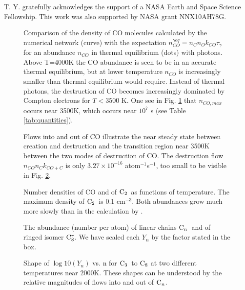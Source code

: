 \documentclass[manuscript]{aastex}
\newcommand{\ctwo}{{\rm C}_2}
\newcommand{\cthree}{{\rm C}_3}
\newcommand{\ceight}{{\rm C}_8}
\newcommand{\ceightr}{{\rm C}_8^r}
\newcommand{\cenn}{{\rm C}_n}
\newcommand{\ncogeq}{n_{CO}^{\gamma eq}}
\begin{document}
\begin{CJK*}{UTF8}{gbsn}
\acknowledgments

T. Y. gratefully acknowledges the support of
a NASA Earth and Space Science Fellowship.
This work was also supported by NASA grant NNX10AH78G.

\clearpage

\begin{figure}
\caption{
Comparison of the density of CO molecules calculated by the numerical
network (curve) with the expectation $\ncogeq = n_C n_O k_{CO} \tau_\gamma$
for an abundance
$n_{CO}$ in thermal equilibrium (dots) with photons.
Above T=4000K the CO abundance is seen to be in an accurate thermal
equilibrium, but at lower temperature $n_{CO}$ is increasingly smaller than
thermal equilibrium would require. Instead of thermal photons,
the destruction of CO becomes increasingly dominated by
Compton electrons for $T < 3500$ K.
One see in Fig. \ref{fig:nco} that $n_{CO,max}$ occurs near 3500K,
which occurs near $10^7$ s (see Table \ref{tab:quantities}).} 
\label{fig:nco}
\end{figure}

\clearpage

\begin{figure}
\caption{
Flows into and out of CO illustrate the near steady state between creation
and destruction and the transition region near 3500K between the two modes
of destruction of CO.
The destruction flow $n_{CO} n_C k_{CO+C}$ is only $3.27 \times
10^{-16}$ atom$^{-1}$s$^{-1}$, too small to be visible in Fig. \ref{fig:flows}. 
} \label{fig:flows}
\end{figure}

\clearpage

\begin{figure}
\caption{
Number densities of CO and of $\ctwo$\ as functions of temperature.
The maximum density of $\ctwo$\ is 0.1 cm$^{-3}$.
Both abundances grow much more slowly than in the calculation by
\citet{2009ApJ...703..642C}.} \label{fig:ncoc2}
\end{figure}

\clearpage

\begin{figure}
\caption{
The abundance (number per atom) of linear chains $\cenn$\ and of ringed isomer
$\ceightr$. We have scaled each $Y_n$ by the factor stated in the box.}
\label{fig:yi}
\end{figure}

\clearpage

\begin{figure}
\caption{
Shape of $\log10(Y_n)$ vs. n for $\cthree$\ to $\ceight$
at two different temperatures
near 2000K. These shapes can be understood by the relative magnitudes of
flows into and out of $\cenn$.
}
\label{fig:cn}
\end{figure}


\end{CJK*}
\end{document}
